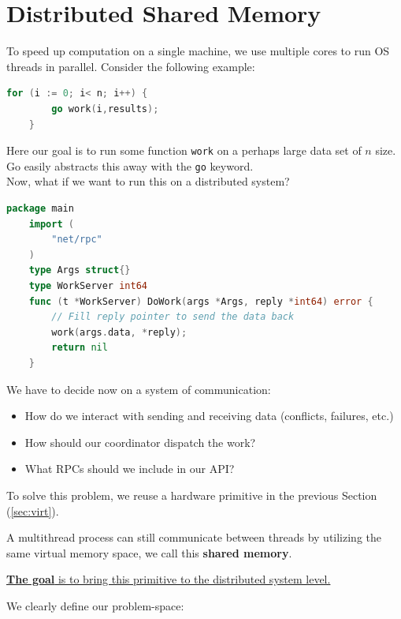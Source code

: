 \section{Distributed Shared Memory}
To speed up computation on a single machine, we use multiple cores to 
run OS threads in parallel. Consider the following example:

\begin{lstlisting}[language=Go]
    for (i := 0; i< n; i++) {
        go work(i,results);
    }  
\end{lstlisting}

\noindent
Here our goal is to run some function \texttt{work} on a perhaps large 
data set of $n$ size. Go easily abstracts this away with the \texttt{go} keyword.\\

\noindent
Now, what if we want to run this on a distributed system?

\begin{lstlisting}[language=Go]
    package main
    import (
        "net/rpc"
    )
    type Args struct{}
    type WorkServer int64
    func (t *WorkServer) DoWork(args *Args, reply *int64) error {
        // Fill reply pointer to send the data back
        work(args.data, *reply);
        return nil
    }
\end{lstlisting}

\noindent
We have to decide now on a system of communication:
\begin{itemize}
    \item How do we interact with sending and receiving data (conflicts, failures, etc.)
    \item How should our coordinator dispatch the work?
    \item What RPCs should we include in our API?
\end{itemize}

\noindent
To solve this problem, we reuse a hardware primitive in the previous Section (\ref{sec:virt}).
\begin{theo}

    A multithread process can still communicate between threads by utilizing the same virtual memory space, we call this \textbf{shared memory}.
\end{theo}
\noindent
\underline{\textbf{The goal} is to bring this primitive to the distributed system level.}

\newpage 

\noindent
We clearly define our problem-space:


